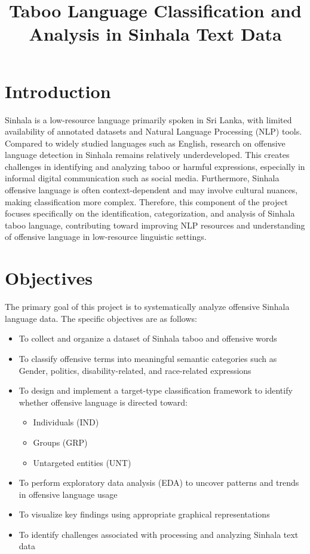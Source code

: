 \documentclass[12pt]{article}
\title{Taboo Language Classification and Analysis in Sinhala Text Data}
\author{}
\date{}
\begin{document}
\maketitle

\section{Introduction}

Sinhala is a low-resource language primarily spoken in Sri Lanka, with limited availability of annotated datasets and Natural Language Processing (NLP) tools. Compared to widely studied languages such as English, research on offensive language detection in Sinhala remains relatively underdeveloped. This creates challenges in identifying and analyzing taboo or harmful expressions, especially in informal digital communication such as social media. Furthermore, Sinhala offensive language is often context-dependent and may involve cultural nuances, making classification more complex. Therefore, this component of the project focuses specifically on the identification, categorization, and analysis of Sinhala taboo language, contributing toward improving NLP resources and understanding of offensive language in low-resource linguistic settings.

\section{Objectives}

The primary goal of this project is to systematically analyze offensive Sinhala language data. The specific objectives are as follows:

\begin{itemize}
    \item To collect and organize a dataset of Sinhala taboo and offensive words
    \item To classify offensive terms into meaningful semantic categories such as Gender, politics, disability-related, and race-related expressions
    \item To design and implement a target-type classification framework to identify whether offensive language is directed toward:
    \begin{itemize}
        \item Individuals (IND)
        \item Groups (GRP)
        \item Untargeted entities (UNT)
    \end{itemize}
    \item To perform exploratory data analysis (EDA) to uncover patterns and trends in offensive language usage
    \item To visualize key findings using appropriate graphical representations
    \item To identify challenges associated with processing and analyzing Sinhala text data
\end{itemize}
\end{document}
